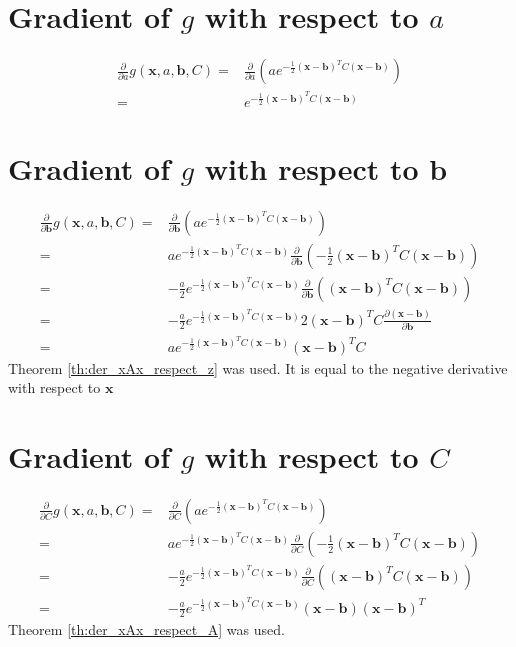 \documentclass{paper}
\newcommand{\vr}[1]{\ensuremath{\boldsymbol{#1}}}
\newcommand{\mx}[1]{\ensuremath{#1}}
\begin{document}
\section{Gradient of $g$ with respect to $a$}
\begin{align}
\frac{\partial}{\partial a} g(\vr{x}, a, \vr{b}, C) =& \frac{\partial}{\partial a} \left(a e^{-\frac{1}{2}(\vr{x}-\vr{b})^T C(\vr{x}-\vr{b})} \right) \nonumber \\
=& e^{-\frac{1}{2}(\vr{x}-\vr{b})^TC(\vr{x}-\vr{b})}
\end{align}

\section{Gradient of $g$ with respect to $\vr{b}$}
\begin{align}
\frac{\partial}{\partial \vr{b}} g(\vr{x}, a, \vr{b}, C) =& \frac{\partial}{\partial \vr{b}} \left(a e^{-\frac{1}{2}(\vr{x}-\vr{b})^T C(\vr{x}-\vr{b})} \right) \nonumber \\
=& a e^{-\frac{1}{2}(\vr{x}-\vr{b})^TC(\vr{x}-\vr{b})} \frac{\partial}{\partial \vr{b}} \left(-\frac{1}{2}(\vr{x}-\vr{b})^T C(\vr{x}-\vr{b})\right) \nonumber \\
=& -\frac{a}{2} e^{-\frac{1}{2}(\vr{x}-\vr{b})^TC(\vr{x}-\vr{b})} \frac{\partial}{\partial \vr{b}} \left((\vr{x}-\vr{b})^T C(\vr{x}-\vr{b})\right) \nonumber \\
=& -\frac{a}{2} e^{-\frac{1}{2}(\vr{x}-\vr{b})^TC(\vr{x}-\vr{b})} 2 (\vr{x}-\vr{b})^T C \frac{\partial (\vr{x}-\vr{b})}{\partial \vr{b}} \nonumber \\
=& a e^{-\frac{1}{2}(\vr{x}-\vr{b})^TC(\vr{x}-\vr{b})} (\vr{x}-\vr{b})^T C
\end{align}
Theorem \ref{th:der_xAx_respect_z} was used.
It is equal to the negative derivative with respect to $\vr{x}$


\section{Gradient of $g$ with respect to $\mx{C}$}
\begin{align}
\frac{\partial}{\partial \mx{C}} g(\vr{x}, a, \vr{b}, C) =& \frac{\partial}{\partial \mx{C}} \left(a e^{-\frac{1}{2}(\vr{x}-\vr{b})^T C(\vr{x}-\vr{b})} \right) \nonumber \\
=& a e^{-\frac{1}{2}(\vr{x}-\vr{b})^TC(\vr{x}-\vr{b})} \frac{\partial}{\partial \mx{C}} \left(-\frac{1}{2}(\vr{x}-\vr{b})^T C(\vr{x}-\vr{b})\right) \nonumber \\
=& -\frac{a}{2} e^{-\frac{1}{2}(\vr{x}-\vr{b})^TC(\vr{x}-\vr{b})} \frac{\partial}{\partial \mx{C}} \left((\vr{x}-\vr{b})^T C(\vr{x}-\vr{b})\right) \nonumber \\
=& -\frac{a}{2} e^{-\frac{1}{2}(\vr{x}-\vr{b})^TC(\vr{x}-\vr{b})} (\vr{x}-\vr{b}) (\vr{x}-\vr{b})^T
\end{align}
Theorem \ref{th:der_xAx_respect_A} was used.
\end{document}
